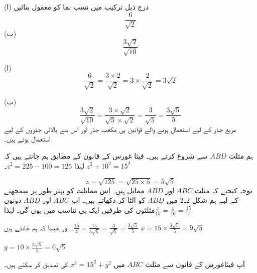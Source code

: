 درج ذیل ترکیب میں نسب نما کو معقول بنائیں
(ا)\[\frac{6}{\sqrt{2}}\]
(ب)\[\frac{3\sqrt{2}}{\sqrt{10}}\]

(ا)\[\frac{6}{\sqrt{2}}=\frac{3\times 2}{\sqrt{2}}=3\times\frac{2}{\sqrt{2}}=3\sqrt{2}\]

(ب)\[\frac{3\sqrt{2}}{\sqrt{10}}=\frac{3\times\sqrt{2}}{\sqrt{5}\times\sqrt{2}}=\frac{3}{\sqrt{5}}=\frac{3\sqrt{5}}{5}\]
مربع جذر کے لیے استعمال ہونے والے قوانین ہی مکعب جذر اور اس سے بالائی جذروں کے لیے استعمال ہوتے ہیں۔

ہم مثلث \(ABD\) سے شروع کرتے ہیں۔ فیثا غورس کے قانون کے مطابق ہم جانتے ہیں کہ \(z^{2}+10^{2}=15^{2}\)
لہٰذا \(z^{2}=225-100=125\)۔

\[z=\sqrt{125}=\sqrt{25\times 5}=5\sqrt{5}\]
توجہ کیجیے کہ مثلث \(ABC\) اور \(ABD\) مماثل ہیں۔ اس مماثلت کو بہتر طور پر سمجھنے کے لیے ہم  شکل  \(2۔2\) میں \(ABD\) کو الٹا کر دکھاتے ہیں۔ اب \(ABC\) اور \(ABD\) دونوں مثلثوں کی طرفیں ایک ہی تناسب میں ہوں گی۔ لہٰذا\(\frac{x}{15}=\frac{y}{10}=\frac{15}{z}\)

۔ اور جیسا کہ ہم جانتے ہیں\(\frac{15}{z}=\frac{15}{5\sqrt{5}}=\frac{3}{\sqrt{5}}=\frac{3\sqrt{5}}{5}\)
\(x=15\times\frac{3\sqrt{5}}{5}=9\sqrt{5}\)

\(y=10\times\frac{3\sqrt{5}}{5}=6\sqrt{5}\)

آپ فیثاغورس کے قانون سے مثلث  \(ABC\) میں \(x^{2}=15^{2}+y^{2}\) کی تصدیق کر سکتے ہیں۔

